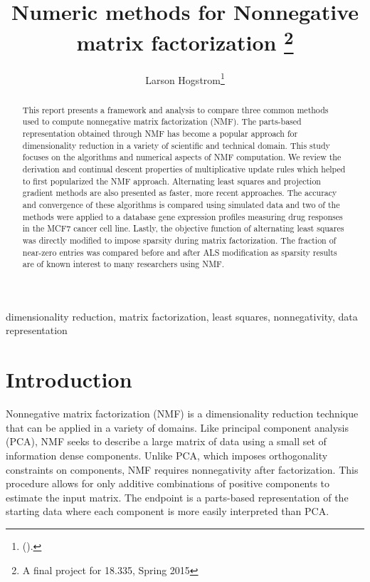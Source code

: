 \documentclass[final,leqno,onefignum,onetabnum]{siamltex1213}
\title{Numeric methods for Nonnegative matrix factorization \thanks{A final project for 18.335, Spring 2015}}
\author{Larson Hogstrom\thanks{
(\email{hogstrom@mit.edu}). }}
\begin{document}
\maketitle
{}%

\begin{abstract}
This report presents a framework and analysis to compare three common methods used to compute nonnegative matrix factorization (NMF). The parts-based representation obtained through NMF has become a popular approach for dimensionality reduction in a variety of scientific and technical domain. This study focuses on the algorithms and numerical aspects of NMF computation. We review the derivation and continual descent properties of multiplicative update rules which helped to first popularized the NMF approach. Alternating least squares and projection gradient methods are also presented as faster, more recent approaches. The accuracy and convergence of these algorithms is compared using simulated data and two of the methods were applied to a database gene expression profiles measuring drug responses in the MCF7 cancer cell line. Lastly, the objective function of alternating least squares was directly modified to impose sparsity during matrix factorization. The fraction of near-zero entries was compared before and after ALS modification as sparsity results are of known interest to many researchers using NMF. 
\end{abstract}

\begin{keywords} dimensionality reduction, matrix factorization, least squares, nonnegativity, data representation \end{keywords}



\pagestyle{myheadings}
\thispagestyle{plain}

\section{Introduction}

Nonnegative matrix factorization (NMF) is a dimensionality reduction technique that can be applied in a variety of domains. Like principal component analysis (PCA), NMF seeks to describe a large matrix of data using a small set of information dense components. Unlike PCA, which imposes orthogonality constraints on components, NMF requires nonnegativity after factorization. This procedure allows for only additive combinations of positive components to estimate the input matrix. The endpoint is a parts-based representation of the starting data where each component is more easily interpreted than PCA. 
\end{document}
